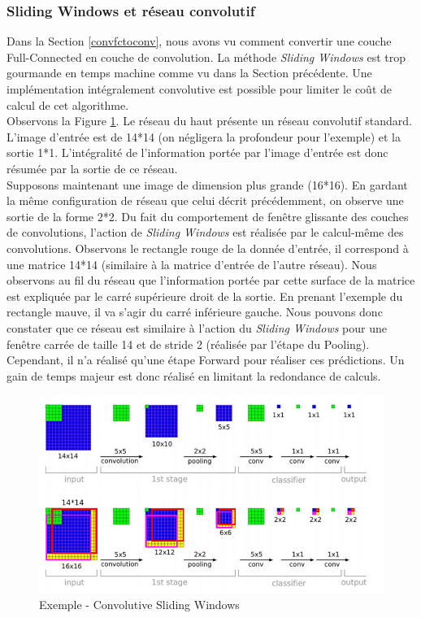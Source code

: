 \subsubsection{Sliding Windows et réseau convolutif}
Dans la Section \ref{convfctoconv}, nous avons vu comment convertir une couche Full-Connected en couche de convolution. La méthode \textit{Sliding Windows} est trop gourmande en temps machine comme vu dans la Section précédente. Une implémentation intégralement convolutive est possible pour limiter le coût de calcul de cet algorithme.\\

\noindent Observons la Figure \ref{slidewindconv}. Le réseau du haut présente un réseau convolutif standard. L'image d'entrée est de 14*14 (on négligera la profondeur pour l'exemple) et la sortie 1*1. L'intégralité de l'information portée par l'image d'entrée est donc résumée par la sortie de ce réseau.\\

\noindent Supposons maintenant une image de dimension plus grande (16*16). En gardant la même configuration de réseau que celui décrit précédemment, on observe une sortie de la forme 2*2. Du fait du comportement de fenêtre glissante des couches de convolutions, l'action de \textit{Sliding Windows} est réalisée par le calcul-même des convolutions. Observons le rectangle rouge de la donnée d'entrée, il correspond à une matrice 14*14 (similaire à la matrice d'entrée de l'autre réseau). Nous observons au fil du réseau que l'information portée par cette surface de la matrice est expliquée par le carré supérieure droit de la sortie. En prenant l'exemple du rectangle mauve, il va s'agir du carré inférieure gauche. Nous pouvons donc constater que ce réseau est similaire à l'action du \textit{Sliding Windows} pour une fenêtre carrée de taille 14 et de stride 2 (réalisée par l'étape du Pooling). Cependant, il n'a réalisé qu'une étape Forward pour réaliser ces prédictions. Un gain de temps majeur est donc réalisé en limitant la redondance de calculs.

\begin{figure}
    \centering
    \includegraphics[scale=0.4]{./tex/computer-vision/object-recognition/convwd.png}
    \caption{Exemple - Convolutive Sliding Windows}
    \label{slidewindconv}
\end{figure}

